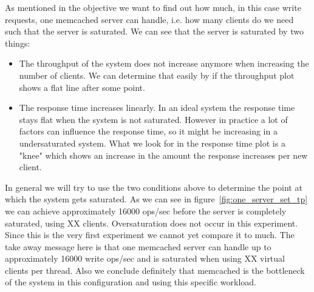 \documentclass[11pt,a4paper]{article}
\begin{document}
%
As mentioned in the objective we want to find out how much, in this case write requests, one memcached server can handle, i.e. how many clients do we need such that the server is saturated.
%
We can see that the server is saturated by two things:
%
\begin{itemize}
	\item The throughput of the system does not increase anymore when increasing the number of clients. We can determine that easily by if the throughput plot shows a flat line after some point.
	\item The response time increases linearly. In an ideal system the response time stays flat when the system is not saturated. However in practice a lot of factors can influence the response time, so it might be increasing in a undersaturated system. What we look for in the response time plot is a "knee" which shows an increase in the amount the response increases per new client. 
\end{itemize}
%
In general we will try to use the two conditions above to determine the point at which the system gets saturated.
%
%
As we can see in figure~\ref{fig:one_server_set_tp} we can achieve approximately 16000 ops/sec before the server is completely saturated, using XX clients.
%
%
Oversaturation does not occur in this experiment.
%
Since this is the very first experiment we cannot yet compare it to much.
%
The take away message here is that one memcached server can handle up to approximately 16000 write ops/sec and is saturated when using XX virtual clients per thread.
%
Also we conclude definitely that memcached is the bottleneck of the system in this configuration and using this specific workload.
%
\end{document}
